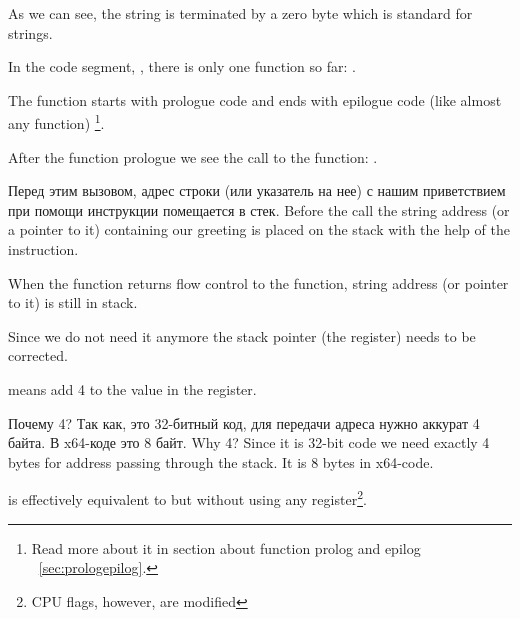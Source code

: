 {As we can see, the string is terminated by a zero byte which is standard for \CCpp strings.}

{In the code segment, , there is only one function so far}: \main.

{The function \main starts with prologue code and ends with epilogue code (like almost any function)}
\footnote{
{Read more about it in section about function prolog and epilog}
~\ref{sec:prologepilog}.}.

{After the function prologue we see the call to the \printf function}: . 

\IFRU
{Перед этим вызовом, адрес строки (или указатель на нее) с нашим приветствием при помощи инструкции \PUSH помещается в стек.}
{Before the call the string address (or a pointer to it) containing our greeting is placed on the stack with the help of the \PUSH instruction.}

{When the \printf function returns flow control to the \main function, string address (or pointer to it) is still in stack.}

{Since we do not need it anymore the stack pointer (the \ESP register) needs to be corrected.}

 
{means add 4 to the value in the \ESP register.}

\IFRU
{Почему 4? Так как, это 32-битный код, для передачи адреса нужно аккурат 4 байта. В x64-коде это 8 байт.}
{Why 4? Since it is 32-bit code we need exactly 4 bytes for address passing through the stack. 
It is 8 bytes in x64-code.}

 
{is effectively equivalent to  but without using any register\footnote{CPU flags, however, are modified}.}

